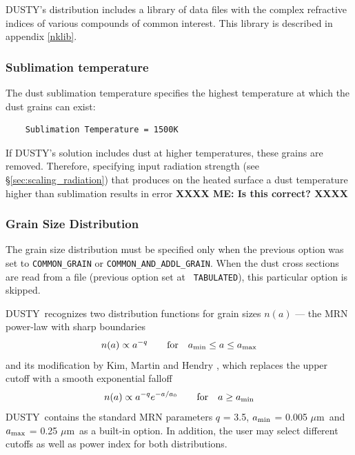 \documentclass[11pt]{article}
\def\D    {{\sf DUSTY}}
\def\eq#1{\begin{equation} #1 \end{equation}}
\def\mic    {\hbox{$\mu$m}}
\begin{document}
\D's distribution includes a library of data files with the complex
refractive indices of various compounds of common interest. This
library is described in appendix \ref{nklib}.

\subsubsection{Sublimation temperature}
\label{sec:sub_temp}

The dust sublimation temperature specifies the highest temperature at which
the dust grains can exist:
\begin{verbatim}
    Sublimation Temperature = 1500K
\end{verbatim}
If \D's solution includes dust at higher temperatures, these grains are
removed. Therefore, specifying input radiation strength (see
\S\ref{sec:scaling_radiation}) that produces on the heated surface a dust
temperature higher than sublimation results in error \textbf{XXXX ME: Is this
correct? XXXX}



\subsubsection{Grain Size Distribution}

The grain size distribution must be specified only when the previous option
was set to {\tt COMMON\_GRAIN} or {\tt COMMON\_AND\_ADDL\_GRAIN}.  When the
dust cross sections are read from a file (previous option set at {\tt
TABULATED}), this particular option is skipped.

\D\ recognizes two distribution functions for grain sizes $n(a)$ --- the MRN
\cite{MRN77} power-law with sharp boundaries \eq{ n(a) \propto a^{-q} \qquad
\hbox{for} \quad a_{\rm min} \le a \le a_{\rm max} } and its modification by
Kim, Martin and Hendry \cite{KMH94}, which replaces the upper cutoff with a
smooth exponential falloff \eq{ n(a) \propto a^{-q} e^{-a/a_0} \qquad
\hbox{for} \quad a \ge a_{\rm min}} \D\ contains the standard MRN parameters
$q$ = 3.5, $a_{\rm min}$ = 0.005 \mic\ and $a_{\rm max}$ = 0.25 \mic\ as a
built-in option.  In addition, the user may select different cutoffs as well
as power index for both distributions.
\end{document}
